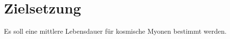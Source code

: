 
\section{Zielsetzung}
\label{sec:Zielsetzung}
Es soll eine mittlere Lebensdauer für kosmische Myonen bestimmt werden.
